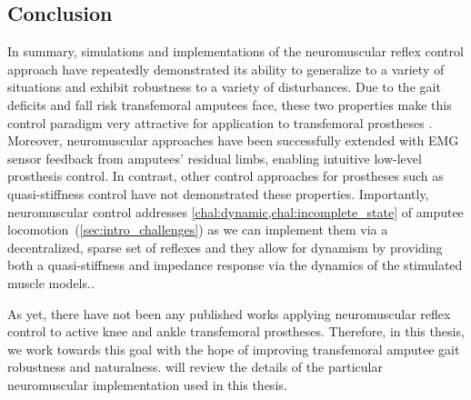 \subsection{Conclusion} 
In summary, simulations and implementations of the neuromuscular reflex control
approach have repeatedly demonstrated its ability to generalize to a variety of
situations and exhibit robustness to a variety of disturbances. Due to the gait
deficits and fall risk transfemoral amputees face, these two properties make
this control paradigm very attractive for application to transfemoral prostheses
. Moreover, neuromuscular approaches have been successfully extended with EMG
sensor feedback from amputees' residual limbs, enabling intuitive low-level
prosthesis control. In contrast, other control approaches for prostheses such as
quasi-stiffness control have not demonstrated these properties. Importantly,
neuromuscular control addresses \cref{chal:dynamic,chal:incomplete_state} of
amputee locomotion~(\cref{sec:intro_challenges}) as we can implement them via a
decentralized, sparse set of reflexes and they allow for dynamism by providing
both a quasi-stiffness and impedance response via the dynamics of the
stimulated muscle models..

As yet, there have not been any published works applying neuromuscular reflex
control to active knee and ankle transfemoral prostheses. Therefore, in this
thesis, we work towards this goal with the hope of improving transfemoral
amputee gait robustness and naturalness.  will review the
details of the particular neuromuscular implementation used in this thesis.

